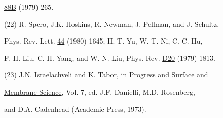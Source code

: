 \hspace*{1.6em} \underline{88B} (1979) 265.

(22) R. Spero, J.K. Hoskins, R. Newman, J. Pellman, and J. Schultz,

\hspace*{1.6em} Phys. Rev. Lett. \underline{44} (1980) 1645; H.-T. Yu, W.-T. Ni, C.-C. Hu,

\hspace*{1.6em} F.-H. Liu, C.-H. Yang, and W.-N. Liu, Phys. Rev. \underline{D20} (1979) 1813.

(23) J.N. Israelachveli and K. Tabor, in \underline{Progress and Surface and}

\hspace*{1.6em} \underline{Membrane Science}, Vol. 7, ed. J.F. Danielli, M.D. Rosenberg,

\hspace*{1.6em} and D.A. Cadenhead (Academic Press, 1973).
